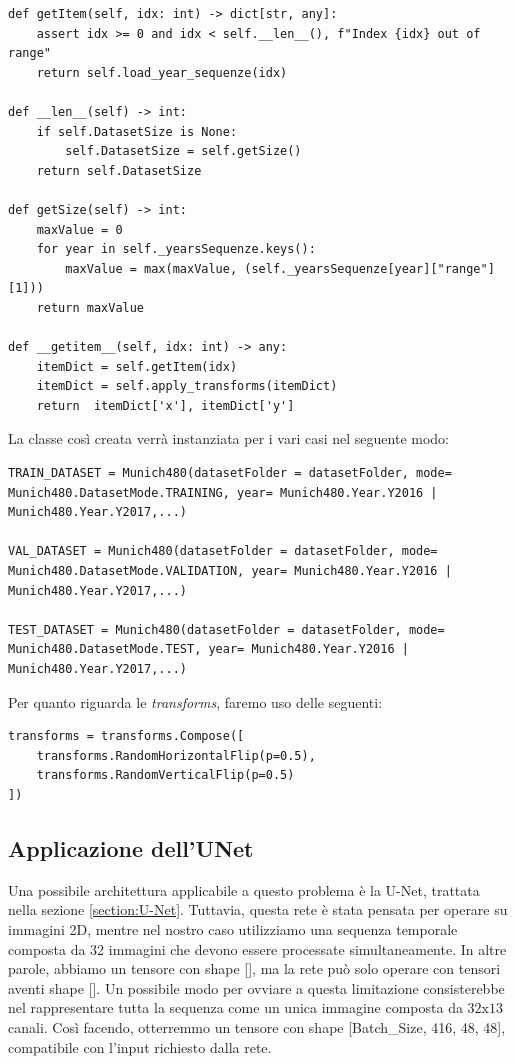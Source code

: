 \begin{lstlisting}
def getItem(self, idx: int) -> dict[str, any]:
    assert idx >= 0 and idx < self.__len__(), f"Index {idx} out of range"
    return self.load_year_sequenze(idx)

def __len__(self) -> int:
    if self.DatasetSize is None:
        self.DatasetSize = self.getSize()
    return self.DatasetSize    

def getSize(self) -> int:
    maxValue = 0
    for year in self._yearsSequenze.keys():
        maxValue = max(maxValue, (self._yearsSequenze[year]["range"][1]))
    return maxValue 
       
def __getitem__(self, idx: int) -> any:
    itemDict = self.getItem(idx)
    itemDict = self.apply_transforms(itemDict)
    return  itemDict['x'], itemDict['y'] 

\end{lstlisting}

La classe così creata verrà instanziata per i vari casi nel seguente modo:
\begin{lstlisting}
TRAIN_DATASET = Munich480(datasetFolder = datasetFolder, mode= Munich480.DatasetMode.TRAINING, year= Munich480.Year.Y2016 | Munich480.Year.Y2017,...)

VAL_DATASET = Munich480(datasetFolder = datasetFolder, mode= Munich480.DatasetMode.VALIDATION, year= Munich480.Year.Y2016 | Munich480.Year.Y2017,...)

TEST_DATASET = Munich480(datasetFolder = datasetFolder, mode= Munich480.DatasetMode.TEST, year= Munich480.Year.Y2016 | Munich480.Year.Y2017,...)  

\end{lstlisting}

Per quanto riguarda le \textit{transforms}, faremo uso delle seguenti:
\begin{lstlisting}
transforms = transforms.Compose([
    transforms.RandomHorizontalFlip(p=0.5),
    transforms.RandomVerticalFlip(p=0.5)
])
\end{lstlisting}

\subsection{Applicazione dell'UNet}
Una possibile architettura applicabile a questo problema è la U-Net, 
trattata nella sezione \ref{section:U-Net}.
Tuttavia, questa rete è stata pensata per operare su immagini 2D, mentre nel nostro caso 
utilizziamo una sequenza temporale composta da 32 immagini che devono 
essere processate simultaneamente. In altre parole, abbiamo un tensore con shape 
[], 
ma la rete può solo operare con tensori aventi shape 
[].
Un possibile modo per ovviare a questa limitazione consisterebbe nel  
rappresentare tutta la sequenza come un unica immagine composta 
da $32\text{x}13$ canali. Così facendo, otterremmo un tensore con
shape [Batch\_Size, 416, 48, 48], compatibile con l'input richiesto dalla rete. 

